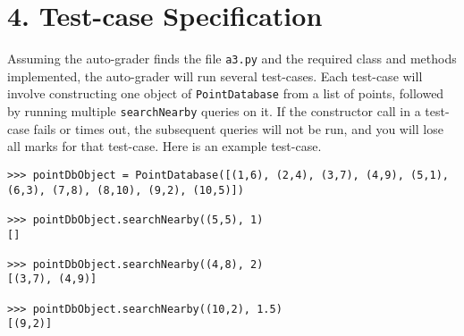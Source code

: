 \documentclass{article}
\begin{document}
\section*{4. Test-case Specification}

Assuming the auto-grader finds the file \texttt{a3.py} and the required class and methods implemented, the auto-grader will run several test-cases. Each test-case will involve constructing one object of \texttt{PointDatabase} from a list of points, followed by running multiple \texttt{searchNearby} queries on it. If the constructor call in a test-case fails or times out, the subsequent queries will not be run, and you will lose all marks for that test-case. Here is an example test-case.

\begin{verbatim}
>>> pointDbObject = PointDatabase([(1,6), (2,4), (3,7), (4,9), (5,1), (6,3), (7,8), (8,10), (9,2), (10,5)])

>>> pointDbObject.searchNearby((5,5), 1)
[]

>>> pointDbObject.searchNearby((4,8), 2)
[(3,7), (4,9)]

>>> pointDbObject.searchNearby((10,2), 1.5)
[(9,2)]
\end{verbatim}
\thispagestyle{plain}
\end{document}
